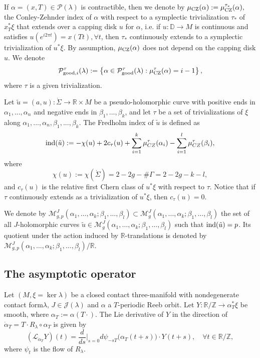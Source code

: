 \documentclass{amsart}
\newcommand{\R}{\mathbb{R}}
\newcommand{\Z}{\mathbb{Z}}
\newcommand{\M}{\mathcal{M}}
\renewcommand{\P}{\mathcal{P}}
\newcommand{\ind}{\textnormal{ind}}
\begin{document}
If $\alpha=(x,T)\in \P(\lambda)$ is  contractible, then we denote by $\mu_{\rm CZ}(\alpha) := \mu_{\rm CZ}^{\tau_*}(\alpha),$
  the Conley-Zehnder index of $\alpha$ with respect to a symplectic trivialization $\tau_*$  of $x_T^*\xi$ that extends over  a capping disk $u$ for $\alpha$, i.e. if $u:\mathbb{D} \to M$ is continuous and satisfies  $u(e^{i2\pi t}) = x(Tt), \forall t$, then $\tau_*$ continuously extends to a symplectic trivialization of $u^*\xi.$ By assumption,  $\mu_{\rm CZ}(\alpha)$ does not depend on the capping disk $u$. We denote 
\begin{equation*}
    \mathcal{P}^\tau_{{\rm good},i}(\lambda):=\left\{\alpha \in \mathcal{P}^{\tau}_{\rm good}(\lambda): \mu_{\rm CZ}^{\tau}(\alpha)=i-1\right\},
\end{equation*}
where $\tau$ is a given trivialization.

  
Let $\tilde u=(a,u):\dot \Sigma \to \R \times M$ be a pseudo-holomorphic curve with positive ends in $\alpha_1,...,\alpha_n$ and negative ends in $\beta_1,...,\beta_k$, and let  $\tau$ be a set of trivializations of $\xi$ along $\alpha_1,...,\alpha_n,\beta_1,...,\beta_k$. The  Fredholm index of $\tilde u$ is defined as
\begin{equation}
{\rm ind}(\tilde u):=-\chi(u)+2c_{\tau}(u)+\sum_{i=1}^k \mu_{CZ}^{\tau}(\alpha_i)-\sum_{i= 1}^l \mu_{CZ}^{\tau}(\beta_i),
\end{equation}
where \begin{equation}
   \chi(u):=\chi(\dot \Sigma) =2-2g-\# \Gamma= 2-2g-k-l,
   \label{eq:chi(u)}
\end{equation}
 and $c_{\tau}(u)$ is the relative first Chern class of  $u^*\xi$ with respect to $\tau$. Notice that if $\tau$ continuously extends as a trivialization of $u^*\xi$, then $c_\tau(u)=0.$ 


We denote by
$\M^J_{g,p}(\alpha_1,\ldots,\alpha_k;\beta_1,\ldots,\beta_l) \subset \M^J_g(\alpha_1,\ldots,\alpha_k;\beta_1,\ldots,\beta_l)$
the set of all $J$-holomor\-phic curves $\tilde u\in \M^J_g(\alpha_1,\ldots,\alpha_k;\beta_1,\ldots,\beta_l)$ such that $\ind(\tilde u)=p$. Its quotient under the action induced by $\R$-translations is denoted  by
$
 \M^J_{g,p}(\alpha_1,\ldots,\alpha_k;\beta_1,\ldots,\beta_l)/\R.
 $




\subsection{The asymptotic operator}
Let $(M,\xi=\ker \lambda)$ be a closed contact three-manifold with nondegenerate contact form$\lambda$, $J \in \mathcal{J}(\lambda)$ and $\alpha$ a  $T$-periodic Reeb orbit. Let $Y:\R / \Z \to \alpha_T^*\xi$ be  smooth, where $\alpha_T := \alpha(T\cdot)$.
The Lie derivative  of $Y$ in the direction of $\dot \alpha_T= T\cdot  R_\lambda \circ
\alpha_T$ is given by
$$(\mathcal{L}_{\dot \alpha_T}Y)(t)=\frac{d}{ds}\Big|_{s=0}d\psi_{-sT}\big(\alpha_T(t+s )\big) \cdot Y(t+s), \quad \forall t\in \R/\Z,$$
where $\psi_t$ is the flow of $R_\lambda$. 
\end{document}
